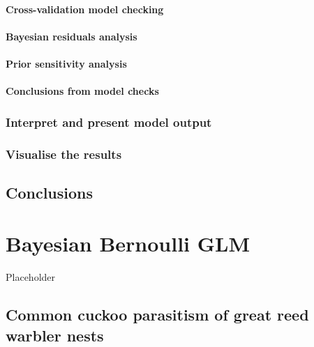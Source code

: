 \documentclass[
]{book}
\begin{document}
\hypertarget{nbglm-cv}{%
\subsubsection{Cross-validation model checking}\label{nbglm-cv}}

\hypertarget{nbglm-resids}{%
\subsubsection{Bayesian residuals analysis}\label{nbglm-resids}}

\hypertarget{nb-sens}{%
\subsubsection{Prior sensitivity analysis}\label{nb-sens}}

\hypertarget{nb-checkconc}{%
\subsubsection{Conclusions from model checks}\label{nb-checkconc}}

\hypertarget{nb-present}{%
\subsection{Interpret and present model output}\label{nb-present}}

\hypertarget{visualise-the-results-2}{%
\subsection{Visualise the results}\label{visualise-the-results-2}}

\hypertarget{conclusions-3}{%
\section{Conclusions}\label{conclusions-3}}

\hypertarget{bern-glm}{%
\chapter{Bayesian Bernoulli GLM}\label{bern-glm}}

Placeholder

\hypertarget{bern-cc}{%
\section{Common cuckoo parasitism of great reed warbler
nests}\label{bern-cc}}
\end{document}
